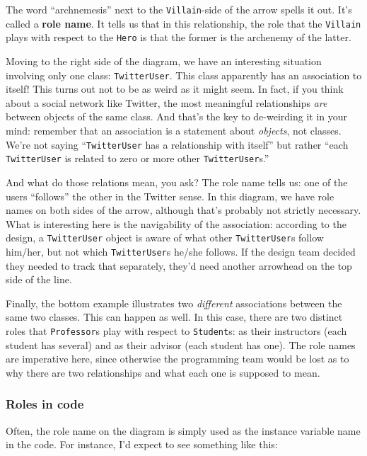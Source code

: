 The word ``archnemesis'' next to the \texttt{Villain}-side of the arrow spells
it out. It's called a \textbf{role name}. It tells us that in this
relationship, the role that the \texttt{Villain} plays with respect to the
\texttt{Hero} is that the former is the archenemy of the latter.

Moving to the right side of the diagram, we have an interesting situation
involving only one class: \texttt{TwitterUser}. This class apparently has an
association to itself! This turns out not to be as weird as it might seem. In
fact, if you think about a social network like Twitter, the most meaningful
relationships \textit{are} between objects of the same class. And that's the
key to de-weirding it in your mind: remember that an association is a
statement about \textit{objects}, not classes. We're not saying
``\texttt{TwitterUser} has a relationship with itself'' but rather ``each
\texttt{TwitterUser} is related to zero or more other \texttt{TwitterUser}s.''

And what do those relations mean, you ask? The role name tells us: one of the
users ``follows'' the other in the Twitter sense. In this diagram, we have role
names on both sides of the arrow, although that's probably not strictly
necessary. What is interesting here is the navigability of the association:
according to the design, a \texttt{TwitterUser} object is aware of what other
\texttt{TwitterUser}s follow him/her, but not which \texttt{TwitterUser}s
he/she follows. If the design team decided they needed to track that
separately, they'd need another arrowhead on the top side of the line.

Finally, the bottom example illustrates two \textit{different} associations
between the same two classes. This can happen as well. In this case, there are
two distinct roles that \texttt{Professor}s play with respect to
\texttt{Student}s: as their instructors (each student has several) and as
their advisor (each student has one). The role names are imperative here,
since otherwise the programming team would be lost as to why there are two
relationships and what each one is supposed to mean.

\subsubsection{Roles in code}

Often, the role name on the diagram is simply used as the instance variable
name in the code. For instance, I'd expect to see something like this:

